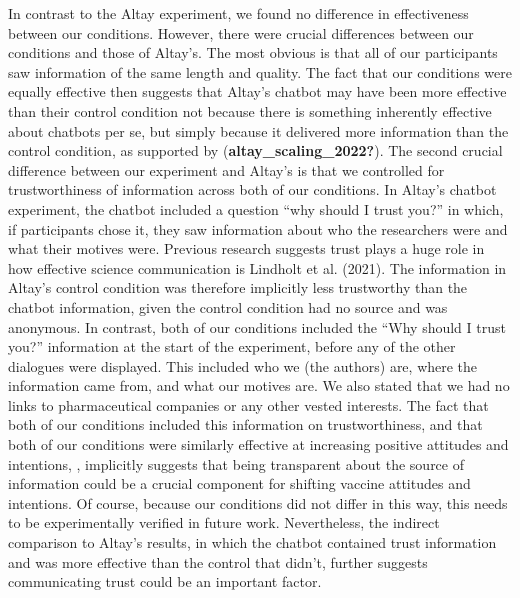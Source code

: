 \documentclass[
  english,
  ,jou,floatsintext]{apa6}
\begin{document}
In contrast to the Altay experiment, we found no difference in effectiveness between our conditions. However, there were crucial differences between our conditions and those of Altay's. The most obvious is that all of our participants saw information of the same length and quality. The fact that our conditions were equally effective then suggests that Altay's chatbot may have been more effective than their control condition not because there is something inherently effective about chatbots per se, but simply because it delivered more information than the control condition, as supported by (\textbf{altay\_scaling\_2022?}). The second crucial difference between our experiment and Altay's is that we controlled for trustworthiness of information across both of our conditions. In Altay's chatbot experiment, the chatbot included a question ``why should I trust you?'' in which, if participants chose it, they saw information about who the researchers were and what their motives were. Previous research suggests trust plays a huge role in how effective science communication is Lindholt et al. (2021). The information in Altay's control condition was therefore implicitly less trustworthy than the chatbot information, given the control condition had no source and was anonymous. In contrast, both of our conditions included the ``Why should I trust you?'' information at the start of the experiment, before any of the other dialogues were displayed. This included who we (the authors) are, where the information came from, and what our motives are. We also stated that we had no links to pharmaceutical companies or any other vested interests. The fact that both of our conditions included this information on trustworthiness, and that both of our conditions were similarly effective at increasing positive attitudes and intentions, , implicitly suggests that being transparent about the source of information could be a crucial component for shifting vaccine attitudes and intentions. Of course, because our conditions did not differ in this way, this needs to be experimentally verified in future work. Nevertheless, the indirect comparison to Altay's results, in which the chatbot contained trust information and was more effective than the control that didn't, further suggests communicating trust could be an important factor.
\end{document}

